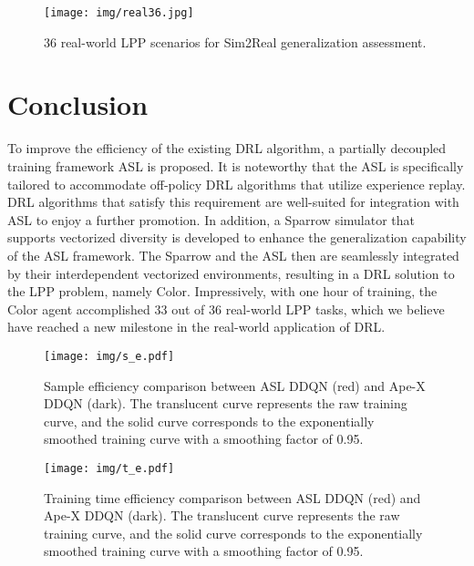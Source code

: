 \documentclass[journal]{IEEEtran}
\begin{document}
\begin{figure}
	\centering
	\texttt{[image: img/real36.jpg]}
	\caption{36 real-world LPP scenarios for Sim2Real generalization assessment.}
	\label{real_all}
\end{figure}

\section{Conclusion}
\label{section5}

To improve the efficiency of the existing DRL algorithm, a partially decoupled training framework ASL is proposed. It is noteworthy that the ASL is specifically tailored to accommodate off-policy DRL algorithms that utilize experience replay. DRL algorithms that satisfy this requirement are well-suited for integration with ASL to enjoy a further promotion. In addition, a Sparrow simulator that supports vectorized diversity is developed to enhance the generalization capability of the ASL framework. The Sparrow and the ASL then are seamlessly integrated by their interdependent vectorized environments, resulting in a DRL solution to the LPP problem, namely Color. Impressively, with one hour of training, the Color agent accomplished 33 out of 36 real-world LPP tasks, which we believe have reached a new milestone in the real-world application of DRL.



{\appendix
	
\begin{figure*}
	\centering
	\texttt{[image: img/s\_e.pdf]}
	\caption{Sample efficiency comparison between ASL DDQN (red) and Ape-X DDQN (dark). The translucent curve represents the raw training curve, and the solid curve corresponds to the exponentially smoothed training curve with a smoothing factor of 0.95.}
	\label{s_e}
\end{figure*}
}	

\begin{figure*}
	\centering
	\texttt{[image: img/t\_e.pdf]}
	\caption{Training time efficiency comparison between ASL DDQN (red) and Ape-X DDQN (dark). The translucent curve represents the raw training curve, and the solid curve corresponds to the exponentially smoothed training curve with a smoothing factor of 0.95.}
	\label{t_e}
\end{figure*}
\end{document}

